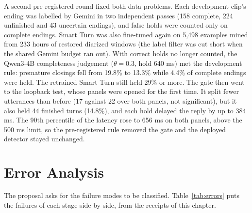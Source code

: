 A second pre-registered round fixed both data problems. Each development clip's ending was
labelled by Gemini in two independent passes (158 complete, 224 unfinished and 43 uncertain
endings), and false holds were counted only on complete endings. Smart Turn was also
fine-tuned again on 5,498 examples mined from 233 hours of restored diarized windows (the
label filter was cut short when the shared Gemini budget ran out). With correct holds no
longer counted, the Qwen3-4B completeness judgement ($\theta = 0.3$, hold 640 ms) met the
development rule: premature closings fell from 19.8\% to 13.3\% while 4.4\% of complete
endings were held. The retrained Smart Turn still held 29\% or more. The gate then went to
the loopback test, whose panels were opened for the first time. It split fewer utterances
than before (17 against 22 over both panels, not significant), but it also held 44 finished
turns (14.8\%), and each hold delayed the reply by up to 384 ms. The 90th percentile of the
latency rose to 656 ms on both panels, above the 500 ms limit, so the pre-registered rule
removed the gate and the deployed detector stayed unchanged.


\section{Error Analysis}
\label{sec:res-errors}

The proposal asks for the failure modes to be classified. Table~\ref{tab:errors} puts the
failures of each stage side by side, from the receipts of this chapter.

